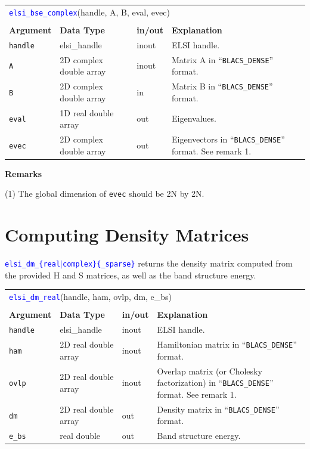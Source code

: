 \documentclass{report}
\newcommand{\api}[1]{\textcolor{blue}{\texttt{#1}}}
\begin{document}
\begin{tabular}[]{|p{20mm}|p{40mm}|p{10mm}|p{92mm}|}
\multicolumn{4}{l}{\api{elsi\_bse\_complex}(handle, A, B, eval, evec)}\\
\multicolumn{4}{l}{}\\
\hline
\multicolumn{1}{|l|}{\textbf{Argument}} & \multicolumn{1}{l|}{\textbf{Data Type}} & \multicolumn{1}{l|}{\textbf{in/out}} & \multicolumn{1}{l|}{\textbf{Explanation}}\\
\hline
\texttt{handle} & elsi\_handle            & inout & ELSI handle.\\
\hline
\texttt{A}      & 2D complex double array & inout & Matrix A in ``\texttt{BLACS\_DENSE}'' format.\\
\hline
\texttt{B}      & 2D complex double array & in    & Matrix B in ``\texttt{BLACS\_DENSE}'' format.\\
\hline
\texttt{eval}   & 1D real double array    & out   & Eigenvalues.\\
\hline
\texttt{evec}   & 2D complex double array & out   & Eigenvectors in ``\texttt{BLACS\_DENSE}'' format. See remark 1.\\
\hline
\end{tabular}

\textbf{Remarks}

(1) The global dimension of \texttt{evec} should be 2N by 2N.

\section{Computing Density Matrices}
\label{sec:dm}
\api{elsi\_dm\_\{real$\vert$complex\}\{\_sparse\}} returns the density matrix computed from the provided H and S matrices, as well as the band structure energy.

\begin{tabular}[]{|p{20mm}|p{40mm}|p{10mm}|p{92mm}|}
\multicolumn{4}{l}{\api{elsi\_dm\_real}(handle, ham, ovlp, dm, e\_bs)}\\
\multicolumn{4}{l}{}\\
\hline
\multicolumn{1}{|l|}{\textbf{Argument}} & \multicolumn{1}{l|}{\textbf{Data Type}} & \multicolumn{1}{l|}{\textbf{in/out}} & \multicolumn{1}{l|}{\textbf{Explanation}}\\
\hline
\texttt{handle} & elsi\_handle         & inout & ELSI handle.\\
\hline
\texttt{ham}    & 2D real double array & inout & Hamiltonian matrix in ``\texttt{BLACS\_DENSE}'' format.\\
\hline
\texttt{ovlp}   & 2D real double array & inout & Overlap matrix (or Cholesky factorization) in ``\texttt{BLACS\_DENSE}'' format. See remark 1.\\
\hline
\texttt{dm}     & 2D real double array & out   & Density matrix in ``\texttt{BLACS\_DENSE}'' format.\\
\hline
\texttt{e\_bs}  & real double          & out   & Band structure energy.\\
\hline
\end{tabular}
\end{document}
